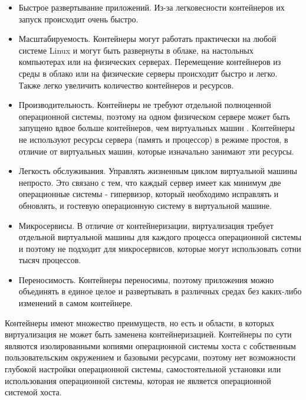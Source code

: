 \begin{itemize}
    \item Быстрое развертывание приложений. Из-за легковесности контейнеров их запуск происходит очень быстро.
    \item Масштабируемость. Контейнеры могут работать практически на любой системе Linux и могут быть развернуты в облаке, на настольных компьютерах или на физических серверах. Перемещение контейнеров из среды в облако или на физические серверы происходит быстро и легко. Также легко увеличить количество контейнеров и ресурсов.
    \item Производительность. Контейнеры не требуют отдельной полноценной операционной системы, поэтому на одном физическом сервере может быть запущено вдвое больше контейнеров, чем виртуальных машин \cite{xavier2013performance}. Контейнеры не используют ресурсы сервера (память и процессор) в режиме простоя, в отличие от виртуальных машин, которые изначально занимают эти ресурсы.
    \item Легкость обслуживания. Управлять жизненным циклом виртуальной машины непросто. Это связано с тем, что каждый сервер имеет как минимум две операционные системы - гипервизор, который необходимо исправлять и обновлять, и гостевую операционную систему в виртуальной машине.
    \item Микросервисы. В отличие от контейнеризации, виртуализация требует отдельной виртуальной машины для каждого процесса операционной системы и поэтому не подходит для микросервисов, которые могут использовать сотни тысяч процессов.
    \item Переносимость. Контейнеры переносимы, поэтому приложения можно объединять в единое целое и развертывать в различных средах без каких-либо изменений в самом контейнере.
\end{itemize}

Контейнеры имеют множество преимуществ, но есть и области, в которых виртуализация не может быть заменена контейнеризацией. Контейнеры по сути являются изолированными копиями операционной системы хоста с собственным пользовательским окружением и базовыми ресурсами, поэтому нет возможности глубокой настройки операционной системы, самостоятельной установки или использования операционной системы, которая не является операционной системой хоста.



